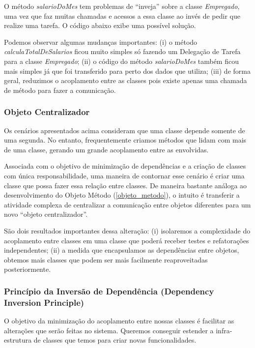 O método \textit{salarioDoMes} tem problemas de ``inveja'' sobre a classe \textit{Empregado}, uma vez que faz muitas chamadas e acessos
a essa classe ao invés de pedir que realize uma tarefa. O código abaixo exibe uma possível solução.



Podemos observar algumas mudanças 
importantes: (i) o método \textit{calculaTotalDeSalarios} ficou muito simples só fazendo um Delegação de Tarefa para a classe \textit{Empregado}; 
(ii) o código do método \textit{salarioDoMes} também ficou mais simples já que foi transferido para perto dos dados que utiliza; (iii) de forma 
geral, reduzimos o acoplamento entre as classes pois existe apenas uma chamada de método para fazer a comunicação.

\subsubsection{Objeto Centralizador}
Os cenários apresentados acima consideram que uma classe depende somente de uma segunda. No entanto, frequentemente criamos métodos 
que lidam com mais de uma classe, gerando um grande acoplamento entre as envolvidas.

Associada com o objetivo de minimização de dependências e a criação de classes com única responsabilidade, uma 
maneira de contornar esse cenário é criar uma classe que possa fazer essa relação entre classes. De maneira 
bastante análoga ao desenvolvimento do Objeto Método 
(\ref{objeto_metodo}), o intuito é transferir a atividade complexa de centralizar a comunicação entre objetos 
diferentes para um novo ``objeto centralizador''.

São dois resultados importantes dessa alteração: (i) isolaremos a complexidade do acoplamento entre classes em uma classe que poderá receber testes e refatorações independentes; (ii) a medida que encapsulamos as dependências entre objetos, obtemos mais classes que podem ser mais facilmente reaproveitadas posteriormente.

\subsubsection{Princípio da Inversão de Dependência (Dependency Inversion Principle)}
O objetivo da minimização do acoplamento entre nossas classes é facilitar as alterações que serão feitas no sistema. Queremos conseguir estender a infra-estrutura de classes que temos para criar novas funcionalidades.
	
